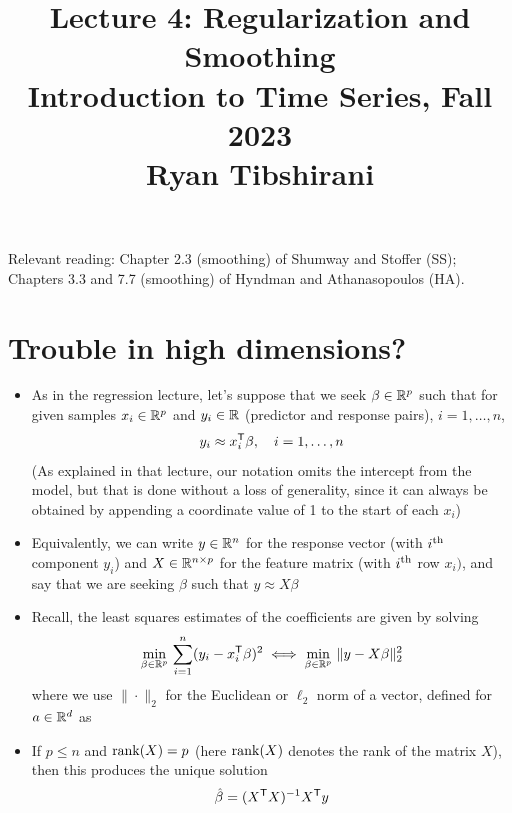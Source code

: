 \documentclass{article}
\title{Lecture 4: Regularization and Smoothing \\ \smallskip  
\large Introduction to Time Series, Fall 2023 \\ \smallskip
Ryan Tibshirani}
\date{}
\begin{document}
\maketitle
\RaggedRight
\vspace{-50pt}

Relevant reading: Chapter 2.3 (smoothing) of Shumway and Stoffer (SS); Chapters
3.3 and 7.7 (smoothing) of Hyndman and Athanasopoulos (HA).

\section{Trouble in high dimensions?} 

\def\new{\text{new}}

\begin{itemize}
\item As in the regression lecture, let's suppose that we seek $\beta \in \mathbb{R}^p$  
  such that for given samples $x_i \in \mathbb{R}^p$ and $y_i \in \mathbb{R}$ (predictor and
  response pairs), $i = 1,\dots,n$,    
  \[
  y_i \approx x_i^{\mathsf{T}} \beta, \quad  i = 1,\dots,n 
  \]
  (As explained in that lecture, our notation omits the intercept from the
  model, but that is done without a loss of generality, since it can always be
  obtained by appending a coordinate value of 1 to the start of each $x_i$) 

\item Equivalently, we can write $y \in \mathbb{R}^n$ for the response vector (with
  $i^{\textnormal{th}}$ component $y_i$) and $X \in \mathbb{R}^{n \times p}$ for the feature matrix
  (with $i^{\textnormal{th}}$ row $x_i)$, and say that we are seeking $\beta$ such that $y
  \approx X \beta$ 

\item Recall, the least squares estimates of the coefficients are given by
  solving  
  \begin{equation}
  \label{eq:ls}
  \min_{\beta \in \mathbb{R}^p} \, \sum_{i=1}^n (y_i - x_i^{\mathsf{T}} \beta)^2 \iff
  \min_{\beta \in \mathbb{R}^p} \, \|y - X \beta\|_2^2
  \end{equation}
  where we use $\|\cdot\|_2$ for the Euclidean or $\ell_2$ norm of a vector,
  defined for $a \in \mathbb{R}^d$ as 

\item If $p \leq n$ and $\operatorname{rank}(X) = p$ (here $\operatorname{rank}(X)$ denotes the rank of the 
  matrix $X$), then this produces the unique solution    
  \begin{equation}
  \label{eq:coef}
  \hat{\beta} = (X^{\mathsf{T}} X)^{-1} X^{\mathsf{T}} y  
  \end{equation}


\end{itemize}
\end{document}
